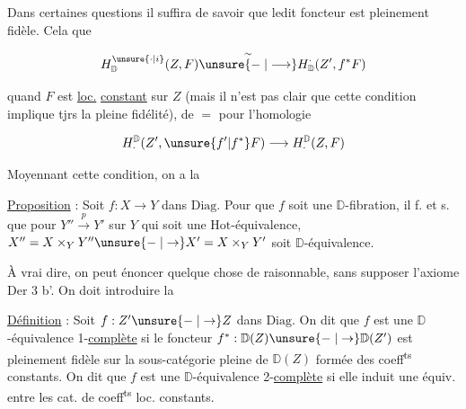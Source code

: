 
Dans certaines questions il suffira de savoir que ledit foncteur est pleinement fidèle. Cela   que

\[
H^{\unsure{\cdot|i}}_{\mathbb D}(Z,F)\overset{\sim}{\unsure{\relbar|\longrightarrow}}H^{\cdot}_{\mathbb D}(Z',f^*F)
\]

quand $F$ est \uline{loc.} \uline{constant} sur $Z$   (mais il n'est pas clair que cette condition implique tjrs la pleine fidélité), de $=$ pour l'homologie

\[
H^{\mathbb D}_{\cdot}(Z',\unsure{f'|f^*}F)\longrightarrow H^{\mathbb D}_{\cdot}(Z,F)
\]




Moyennant cette condition, on a la

\uline{Proposition} :  Soit $f:X\to Y$ dans $\mathrm{Diag}$. Pour que $f$ soit une $\mathbb D$-fibration, il f. et s. que pour $Y''\xrightarrow{p}Y'$ sur $Y$ qui soit une $\mathrm{Hot}$-équivalence, $X''=X\times_Y Y''\unsure{\relbar|\to} X'=X\times_Y Y'$ soit  $\mathbb D$-équivalence.

À vrai dire, on peut énoncer quelque chose de raisonnable, sans supposer l'axiome Der 3 b'. On doit introduire la

\uline{Définition} : Soit $f:Z'\unsure{\relbar|\to}Z$ dans $\mathrm{Diag}$. On dit que $f$ est une $\mathbb D$-équivalence 1-\uline{complète} si le foncteur $f^*:\mathbb D(Z)\unsure{\relbar|\to}\mathbb D(Z')$ est pleinement fidèle sur la sous-catégorie pleine de $\mathbb D(Z)$ formée des coeff\textsuperscript{ts}  constants. On dit que $f$ est une $\mathbb D$-équivalence 2-\uline{complète} si elle induit une équiv. entre les cat. de coeff\textsuperscript{ts} loc. constants.

